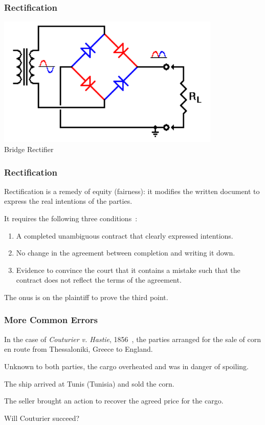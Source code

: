 \begin{frame}
\frametitle{Rectification}

\begin{center}
	\includegraphics[width=0.8\textwidth]{images/bridgerectifier.png}\\
	Bridge Rectifier~\cite{rectifier}
\end{center}

\end{frame}



\begin{frame}
\frametitle{Rectification}

Rectification is a remedy of equity (fairness): it modifies the written document to express the real intentions of the parties.

It requires the following three conditions~\cite{lba}:

\begin{enumerate}
	\item A completed unambiguous contract that clearly expressed intentions.
	\item No change in the agreement between completion and writing it down.
	\item Evidence to convince the court that it contains a mistake such that the contract does not reflect the terms of the agreement.
\end{enumerate}

The onus is on the plaintiff to prove the third point.

\end{frame}


\begin{frame}
\frametitle{More Common Errors}

In the case of \textit{Couturier v. Hastie}, 1856~\cite{lba}, the parties arranged for the sale of corn en route from Thessaloniki, Greece to England.

Unknown to both parties, the cargo overheated and was in danger of spoiling.

The ship arrived at Tunis (Tunisia) and sold the corn.

The seller brought an action to recover the agreed price for the cargo.

Will Couturier succeed?

\end{frame}



